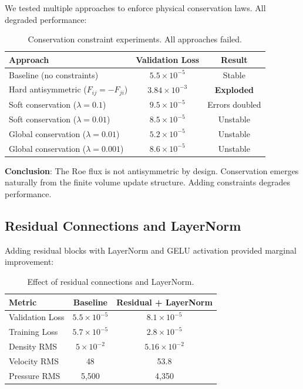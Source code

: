 \documentclass[11pt,a4paper]{article}
\begin{document}
We tested multiple approaches to enforce physical conservation laws. All degraded performance:

\begin{table}[H]
\centering
\begin{tabular}{lcc}
\toprule
Approach & Validation Loss & Result \\
\midrule
Baseline (no constraints) & $5.5 \times 10^{-5}$ & Stable \\
Hard antisymmetric ($F_{ij} = -F_{ji}$) & $3.84 \times 10^{-3}$ & \textbf{Exploded} \\
Soft conservation ($\lambda = 0.1$) & $9.5 \times 10^{-5}$ & Errors doubled \\
Soft conservation ($\lambda = 0.01$) & $8.5 \times 10^{-5}$ & Unstable \\
Global conservation ($\lambda = 0.01$) & $5.2 \times 10^{-5}$ & Unstable \\
Global conservation ($\lambda = 0.001$) & $8.6 \times 10^{-5}$ & Unstable \\
\bottomrule
\end{tabular}
\caption{Conservation constraint experiments. All approaches failed.}
\label{tab:conservation}
\end{table}

\textbf{Conclusion}: The Roe flux is not antisymmetric by design. Conservation emerges naturally from the finite volume update structure. Adding constraints degrades performance.

\subsection{Residual Connections and LayerNorm}

Adding residual blocks with LayerNorm and GELU activation provided marginal improvement:

\begin{table}[H]
\centering
\begin{tabular}{lcc}
\toprule
Metric & Baseline & Residual + LayerNorm \\
\midrule
Validation Loss & $5.5 \times 10^{-5}$ & $8.1 \times 10^{-5}$ \\
Training Loss & $5.7 \times 10^{-5}$ & $2.8 \times 10^{-5}$ \\
Density RMS & $5 \times 10^{-2}$ & $5.16 \times 10^{-2}$ \\
Velocity RMS & 48 & 53.8 \\
Pressure RMS & 5,500 & 4,350 \\
\bottomrule
\end{tabular}
\caption{Effect of residual connections and LayerNorm.}
\label{tab:residual}
\end{table}
\end{document}
